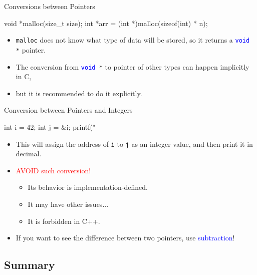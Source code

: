 \documentclass[handout]{beamer}
\newcommand{\red}[1]{\textcolor{red}{#1}}
\newcommand{\blue}[1]{\textcolor{blue}{#1}}
\newcommand{\ttt}[1]{\texttt{#1}}
\newcommand{\bluett}[1]{\blue{\ttt{#1}}}
\theoremstyle{definition}
\begin{document}
\begin{frame}[fragile]{Conversions between Pointers}
    \begin{cpp}
void *malloc(size_t size);
int *arr = (int *)malloc(sizeof(int) * n);
    \end{cpp}
    \begin{itemize}
        \item \ttt{malloc} does not know what type of data will be stored, so it returns a \bluett{void }\ttt{*} pointer.
        \item The conversion from \bluett{void }\ttt{*} to pointer of other types can happen implicitly in C,
        \item but it is recommended to do it explicitly.
    \end{itemize}
\end{frame}

\begin{frame}[fragile]{Conversion between Pointers and Integers}
    \begin{cpp}
int i = 42;
int j = &i;
printf("%
    \end{cpp}
    \begin{itemize}
        \item This will assign the address of \ttt{i} to \ttt{j} as an integer value, and then print it in decimal.
        \pause
        \item \red{AVOID such conversion!}
        \begin{itemize}
            \item Its behavior is implementation-defined.
            \item It may have other issues...
            \item It is forbidden in C++.
        \end{itemize}
        \pause
        \item If you want to see the difference between two pointers, use \blue{subtraction}!
    \end{itemize}
\end{frame}

\subsection{Summary}
\end{document}
